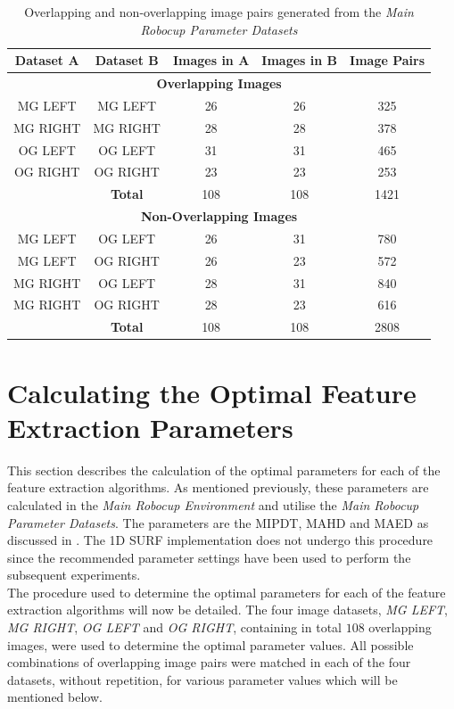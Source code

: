 \documentclass[11pt]{report}
\begin{document}
\begin{table}
\centering
\caption{Overlapping and non-overlapping image pairs generated from the \textit{Main Robocup Parameter Datasets} }
\begin{tabular}{|c|c|c|c|c|}
\hline 
\textbf{Dataset A} & \textbf{Dataset B} & \textbf{Images in A} & \textbf{Images in B} & \textbf{Image Pairs}\tabularnewline
\hline 
\hline 
\multicolumn{5}{|c|}{\textbf{Overlapping Images}}\tabularnewline
\hline 
MG LEFT & MG LEFT & 26 & 26 & 325\tabularnewline
\hline 
MG RIGHT & MG RIGHT & 28 & 28 & 378\tabularnewline
\hline 
OG LEFT & OG LEFT & 31 & 31 & 465\tabularnewline
\hline 
OG RIGHT & OG RIGHT & 23 & 23 & 253\tabularnewline
\hline 
 & \textbf{Total} & 108 & 108 & 1421\tabularnewline
\hline 
\multicolumn{5}{|c|}{\textbf{Non-Overlapping Images}}\tabularnewline
\hline 
MG LEFT & OG LEFT & 26 & 31 & 780\tabularnewline
\hline 
MG LEFT & OG RIGHT & 26 & 23 & 572\tabularnewline
\hline 
MG RIGHT & OG LEFT & 28 & 31 & 840\tabularnewline
\hline 
MG RIGHT & OG RIGHT & 28 & 23 & 616\tabularnewline
\hline 
 & \textbf{Total} & 108 & 108 & 2808\tabularnewline
\hline 
\end{tabular}
\label{tab:mrpd}
\end{table}

\section{Calculating the Optimal Feature Extraction Parameters}
\label{sec:optimalParameters}
This section describes the calculation of the optimal parameters for each of the feature extraction algorithms. As mentioned previously, these parameters are calculated in the \textit{Main Robocup Environment} and utilise the \textit{Main Robocup Parameter Datasets}. The parameters are the MIPDT, MAHD and MAED as discussed in . The 1D SURF implementation does not undergo this procedure since the recommended parameter settings \citet{Anderson} have been used to perform the subsequent experiments.\\

The procedure used to determine the optimal parameters for each of the feature extraction algorithms will now be detailed. The four image datasets, \textit{MG LEFT}, \textit{MG RIGHT}, \textit{OG LEFT} and \textit{OG RIGHT}, containing in total $108$ overlapping images, were used to determine the optimal parameter values. All possible combinations of overlapping image pairs were matched in each of the four datasets, without repetition, for various parameter values which will be mentioned below. 
\end{document}
